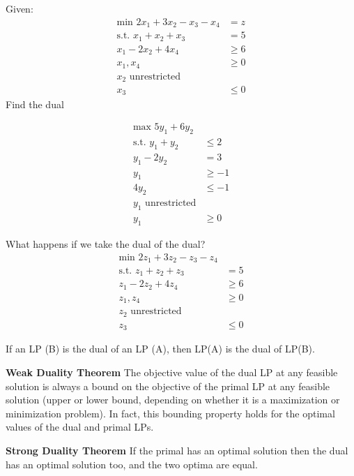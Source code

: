 \documentclass{article}
\begin{document}
\begin{eg}
    Given: \\
    \begin{align*}
        \text{min }2x_1+3x_2-x_3-x_4&=z \\
        \text{s.t. }x_1+x_2+x_3 &=5 \\
        x_1-2x_2+4x_4&\geq 6 \\
        x_1, x_4 &\geq 0 \\
        x_2 \text{ unrestricted} \\
        x_3&\leq 0
    \end{align*}
    Find the dual
\end{eg}
\begin{answer}
    \begin{align*}
        \text{max }5y_1+6y_2 \\
        \text{s.t. }y_1+y_2 &\leq 2 \\
        y_1-2y_2 &=3 \\
        y_1&\geq -1 \\
        4y_2&\leq -1 \\
        y_1 \text{ unrestricted} \\
        y_1&\geq 0
    \end{align*} 
\end{answer}

What happens if we take the dual of the dual?
\begin{align*}
    \text{min }2z_1+3z_2-z_3-z_4 \\
    \text{s.t. }z_1+z_2+z_3 &= 5 \\
    z_1-2z_2 +4z_4 &\geq 6 \\
    z_1,z_4&\geq 0 \\
    z_2 \text{ unrestricted} \\
    z_3&\leq 0
\end{align*}

If an LP (B) is the dual of an LP (A), then LP(A) is the dual of LP(B).

\begin{theorem}{\textbf{Weak Duality Theorem}}
    The objective value of the dual LP at any feasible solution is always a bound 
    on the objective of the primal LP at any feasible solution (upper or 
    lower bound, depending on whether it is a maximization or minimization problem). 
    In fact, this bounding property holds for the optimal values of the dual and primal 
    LPs.
\end{theorem}

\begin{theorem}{\textbf{Strong Duality Theorem}}
    If the primal has an optimal solution then the dual has an optimal solution too,
     and the two optima are equal.
\end{theorem}
\end{document}
